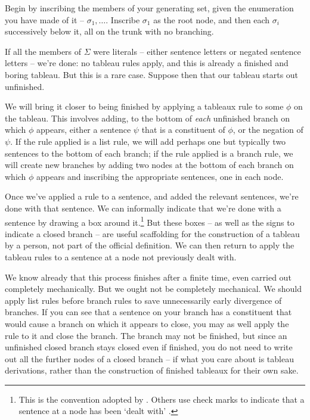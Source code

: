 Begin by inscribing the members of your generating set, given the enumeration you have made of it – $\sigma_{1},…$. Inscribe $\sigma_{1}$ as the root node, and then each $\sigma_{i}$ successively below it, all on the trunk with no branching. 

If all the members of $\Sigma$ were literals – either sentence letters or negated sentence letters – we're done: no tableau rules apply, and this is already a finished and boring tableau. But this is a rare case. Suppose then that our tableau starts out unfinished.

We will bring it closer to being finished by applying a tableaux rule to some $\phi$ on the tableau. This involves adding, to the bottom of \emph{each} unfinished branch on which $\phi$ appears, either a sentence $\psi$ that is a constituent of $\phi$, or the negation of $\psi$. If the rule applied is a list rule, we will add perhaps one but typically two sentences to the bottom of each branch; if the rule applied is a branch rule, we will create new branches by adding two nodes at the bottom of each branch on which $\phi$ appears and inscribing the appropriate sentences, one in each node. 

Once we've applied a rule to a sentence, and added the relevant sentences, we're done with that sentence. We can informally indicate that we're done with a sentence by drawing a box around it.\footnote{This is the convention adopted by \citet{bevpospa}. Others use check marks to indicate that a sentence at a node has been `dealt with' \citep{jefforlos}.} But these boxes – as well as the signs to indicate a closed branch – are useful scaffolding for the construction of a tableau by a person, not part of the official definition. We can then return to apply the tableau rules to a sentence at a node not previously dealt with.

We know already that this process finishes after a finite time, even carried out completely mechanically. But we ought not be completely mechanical. We should apply list rules before branch rules to save unnecessarily early divergence of branches. If you can see that a sentence on your branch has a constituent that would cause a branch on which it appears to close, you may as well apply the rule to it and close the branch. The branch may not be finished, but since an unfinished closed branch stays closed even if finished, you do not need to write out all the further nodes of a closed branch – if what you care about is tableau derivations, rather than the construction of finished tableaux for their own sake.  


